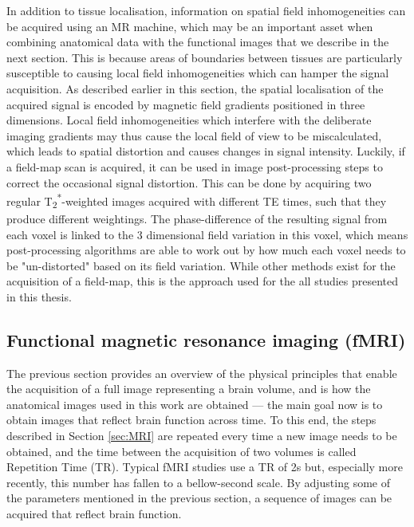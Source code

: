  
 In addition to tissue localisation, information on spatial field inhomogeneities can be acquired using an MR machine, which may be an important asset when combining anatomical data with the functional images that we describe in the next section. This is because areas of boundaries between tissues are particularly susceptible to causing local field inhomogeneities which can hamper the signal acquisition. As described earlier in this section, the spatial localisation of the acquired signal is encoded by magnetic field gradients positioned in three dimensions. Local field inhomogeneities which interfere with the deliberate imaging gradients may thus cause the local field of view to be miscalculated, which leads to spatial distortion and causes changes in signal intensity. Luckily, if a field-map scan is acquired, it can be used in image post-processing steps to correct the occasional signal distortion. This can be done by acquiring two regular T\textsubscript{2}\textsuperscript{*}-weighted images acquired with different TE times, such that they produce different weightings. The phase-difference of the resulting signal from each voxel is linked to the 3 dimensional field variation in this voxel, which means post-processing algorithms are able to work out by how much each voxel needs to be "un-distorted" based on its field variation. While other methods exist for the acquisition of a field-map, this is the approach used for the all studies presented in this thesis. 



\subsection{Functional magnetic resonance imaging (fMRI)}\label{sub:fMRI}




The previous section provides an overview of the physical principles that enable the acquisition of a full image representing a brain volume, and is how the anatomical images used in this work are obtained --- the main goal now is to obtain images that reflect brain function across time.  To this end, the steps described in Section \ref{sec:MRI} are repeated every time a new image needs to be obtained, and the time between the acquisition of two volumes is called Repetition Time (TR). Typical fMRI studies use a TR of 2s but, especially more recently, this number has fallen to a bellow-second scale. 
By adjusting some of the parameters mentioned in the previous section, a sequence of images can be acquired that reflect brain function. 

